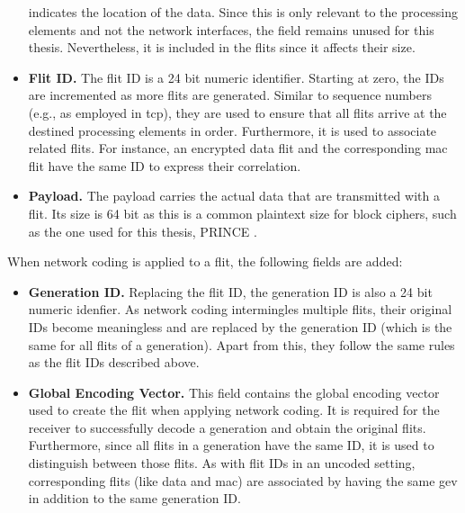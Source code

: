 \begin{itemize}
        indicates the location of the data. Since this is only relevant to the processing elements and not the network interfaces, the field remains
        unused for this thesis. Nevertheless, it is included in the flits since it affects their size.
    \item \textbf{Flit ID.} The flit ID is a 24 bit numeric identifier. Starting at zero, the IDs are incremented as more flits are generated.
        Similar to sequence numbers (e.g., as employed in \gls{tcp}), they are used to ensure that all flits arrive at the destined processing
        elements in order. Furthermore, it is used to associate related flits. For instance, an encrypted data flit and the corresponding \gls{mac}
        flit have the same ID to express their correlation.
    \item \textbf{Payload.} The payload carries the actual data that are transmitted with a flit. Its size is 64 bit as this is a common plaintext
        size for block ciphers, such as the one used for this thesis, PRINCE \cite{borghoff12prince}.
\end{itemize}
\vspace{0.5\baselineskip}

When network coding is applied to a flit, the following fields are added:
\begin{itemize}
    \item \textbf{Generation ID.} Replacing the flit ID, the generation ID is also a 24 bit numeric idenfier. As network coding intermingles multiple
        flits, their original IDs become meaningless and are replaced by the generation ID (which is the same for all flits of a generation). Apart
        from this, they follow the same rules as the flit IDs described above.
    \item \textbf{Global Encoding Vector.} This field contains the global encoding vector used to create the flit when applying network coding. It is
        required for the receiver to successfully decode a generation and obtain the original flits. Furthermore, since all flits in a generation have
        the same ID, it is used to distinguish between those flits. As with flit IDs in an uncoded setting, corresponding flits (like data and
        \gls{mac}) are associated by having the same \gls{gev} in addition to the same generation ID.
\end{itemize}
\vspace{0.5\baselineskip}

